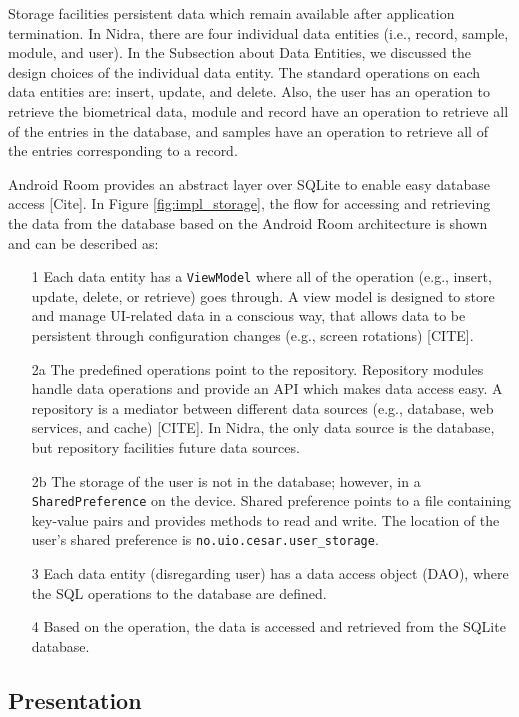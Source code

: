 Storage facilities persistent data which remain available after application termination. In Nidra, there are four individual data entities (i.e., record, sample, module, and user). In the Subsection about Data Entities, we discussed the design choices of the individual data entity. The standard operations on each data entities are: insert, update, and delete. Also, the user has an operation to retrieve the biometrical data, module and record have an operation to retrieve all of the entries in the database, and samples have an operation to retrieve all of the entries corresponding to a record. 

Android Room provides an abstract layer over SQLite to enable easy database access [Cite]. In Figure \ref{fig:impl_storage}, the flow for accessing and retrieving the data from the database based on the Android Room architecture is shown and can be described as:

\begin{itemize}
	\item[1] Each data entity has a \verb|ViewModel| where all of the operation (e.g., insert, update, delete, or retrieve) goes through.  A view model is designed to store and manage UI-related data in a conscious way, that allows data to be persistent through configuration changes (e.g., screen rotations) [CITE]. 
 	\item[2a] The predefined operations point to the repository. Repository modules handle data operations and provide an API  which makes data access easy. A repository is a mediator between different data sources (e.g., database, web services, and cache) [CITE]. In Nidra, the only data source is the database, but repository facilities future data sources. 
	\item[2b] The storage of the user is not in the database; however, in a \verb|SharedPreference| on the device. Shared preference points to a file containing key-value pairs and provides methods to read and write. The location of the user's shared preference is \verb|no.uio.cesar.user_storage|. 
	\item[3] Each data entity (disregarding user) has a data access object (DAO), where the SQL operations to the database are defined. 
	\item[4] Based on the operation, the data is accessed and retrieved from the SQLite database.
\end{itemize}



\subsection{Presentation}



